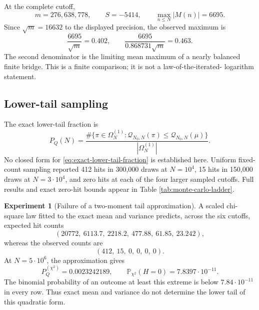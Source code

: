 \documentclass[11pt,reqno]{amsart}
\numberwithin{equation}{section}
\theoremstyle{plain}
\theoremstyle{definition}
\newtheorem{experiment}[theorem]{Experiment}
\theoremstyle{remark}
\newcommand{\Prob}{\mathbb P}
\newcommand{\Om}{\Omega}
\newcommand{\QF}{\mathcal Q}
\begin{document}
At the complete cutoff,
\begin{equation}
m=276{,}638{,}778,\qquad S=-5414,\qquad
\max_{n\leq N}|M(n)|=6695.
\label{eq:complete-cutoff-path-data}
\end{equation}
Since \(\sqrt m=16632\) to the displayed precision, the observed maximum is
\begin{equation}
\frac{6695}{\sqrt m}=0.402,\qquad
\frac{6695}{0.868731\sqrt m}=0.463.
\label{eq:observed-maximum-relative-scale}
\end{equation}
The second denominator is the limiting mean maximum of a nearly balanced
finite bridge.  This is a finite comparison; it is not a law-of-the-iterated-
logarithm statement.

\subsection{Lower-tail sampling}
\label{subsec:lower-tail-sampling}

The exact lower-tail fraction is
\begin{equation}
P_Q(N)=\frac{\#\{\pi\in\Om_N^{(1)}:
\QF_{N_0,N}(\pi)\leq\QF_{N_0,N}(\mu)\}}
{|\Om_N^{(1)}|}.
\label{eq:exact-lower-tail-fraction}
\end{equation}
No closed form for \eqref{eq:exact-lower-tail-fraction} is established here.
Uniform fixed-count sampling reported 412 hits in 300,000 draws at
\(N=10^4\), 15 hits in 150,000 draws at \(N=3\cdot10^4\), and zero hits at
each of the four larger sampled cutoffs.  Full results and exact zero-hit
bounds appear in Table \ref{tab:monte-carlo-ladder}.

\begin{experiment}[Failure of a two-moment tail approximation]
\label{exp:two-moment-rejection}
A scaled chi-square law fitted to the exact mean and variance predicts,
across the six cutoffs, expected hit counts
\begin{equation}
(20772,\ 6113.7,\ 2218.2,\ 477.88,\ 61.85,\ 23.242),
\label{eq:chi-square-expected-hits}
\end{equation}
whereas the observed counts are
\begin{equation}
(412,\ 15,\ 0,\ 0,\ 0,\ 0).
\label{eq:observed-hit-counts}
\end{equation}
At \(N=5\cdot10^6\), the approximation gives
\begin{equation}
P_Q^{(\chi^2)}=0.0023242189,\qquad
\Prob_{\chi^2}(H=0)=7.8397\cdot10^{-11}.
\label{eq:chi-square-zero-probability}
\end{equation}
The binomial probability of an outcome at least this extreme is below
\(7.84\cdot10^{-11}\) in every row.  Thus exact mean and variance do not
determine the lower tail of this quadratic form.
\end{experiment}
\end{document}
